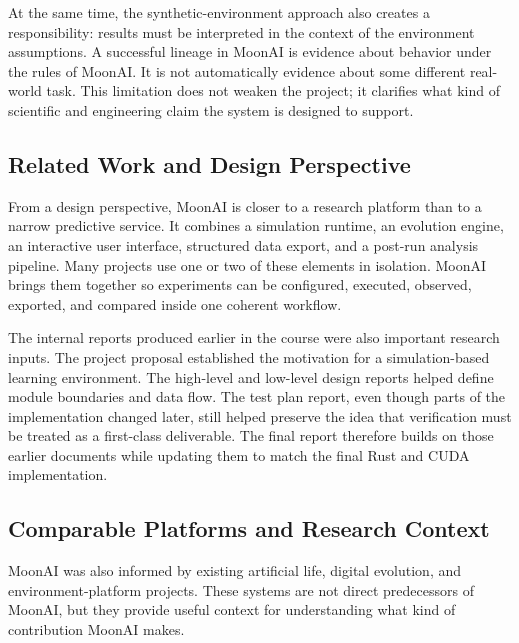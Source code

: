 At the same time, the synthetic-environment approach also creates a responsibility: results must
be interpreted in the context of the environment assumptions. A successful lineage in MoonAI is
evidence about behavior under the rules of MoonAI. It is not automatically evidence about some
different real-world task. This limitation does not weaken the project; it clarifies what kind
of scientific and engineering claim the system is designed to support.

\subsection{Related Work and Design Perspective}

From a design perspective, MoonAI is closer to a research platform than to a narrow predictive
service. It combines a simulation runtime, an evolution engine, an interactive user interface,
structured data export, and a post-run analysis pipeline. Many projects use one or two of these
elements in isolation. MoonAI brings them together so experiments can be configured, executed,
observed, exported, and compared inside one coherent workflow.

The internal reports produced earlier in the course were also important research inputs. The
project proposal established the motivation for a simulation-based learning environment. The
high-level and low-level design reports helped define module boundaries and data flow. The test
plan report, even though parts of the implementation changed later, still helped preserve the
idea that verification must be treated as a first-class deliverable. The final report therefore
builds on those earlier documents while updating them to match the final Rust and CUDA
implementation.

\subsection{Comparable Platforms and Research Context}

MoonAI was also informed by existing artificial life, digital evolution, and environment-platform
projects. These systems are not direct predecessors of MoonAI, but they provide useful context
for understanding what kind of contribution MoonAI makes.

